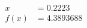 \documentclass[preview]{standalone}
\begin{document}
\begin{align*}
x &= 0.2223\\f(x) &= 4.3893688
\end{align*}
\end{document}
